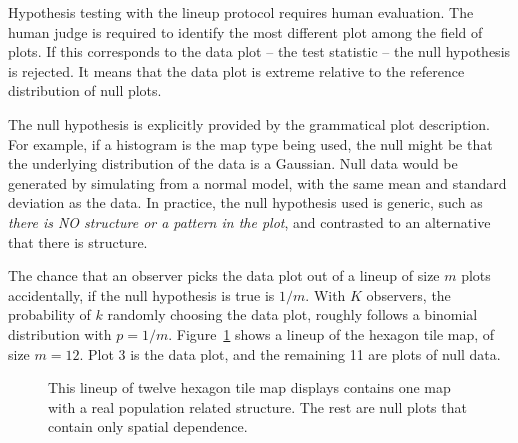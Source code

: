 \documentclass[
doublespace,
  times]{anzsauth}
\begin{document}
Hypothesis testing with the lineup protocol requires human evaluation.
The human judge is required to identify the most different plot among
the field of plots. If this corresponds to the data plot -- the test
statistic -- the null hypothesis is rejected. It means that the data
plot is extreme relative to the reference distribution of null plots.

The null hypothesis is explicitly provided by the grammatical plot
description. For example, if a histogram is the map type being used, the
null might be that the underlying distribution of the data is a
Gaussian. Null data would be generated by simulating from a normal
model, with the same mean and standard deviation as the data. In
practice, the null hypothesis used is generic, such as \emph{there is NO
structure or a pattern in the plot}, and contrasted to an alternative
that there is structure.

The chance that an observer picks the data plot out of a lineup of size
\(m\) plots accidentally, if the null hypothesis is true is \(1/m\).
With \(K\) observers, the probability of \(k\) randomly choosing the
data plot, roughly follows a binomial distribution with \(p=1/m\).
Figure~\ref{fig-lineup} shows a lineup of the hexagon tile map, of size
\(m=12\). Plot 3 is the data plot, and the remaining 11 are plots of
null data.

\begin{figure}


\caption{\label{fig-lineup}This lineup of twelve hexagon tile map
displays contains one map with a real population related structure. The
rest are null plots that contain only spatial dependence.}

\end{figure}%
\end{document}
